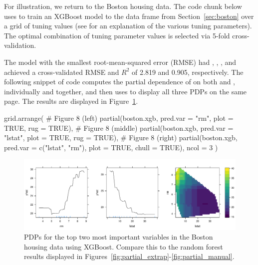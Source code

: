 For illustration, we return to the Boston housing data. The code chunk below uses  to train an XGBoost model to the  data frame from Section~\ref{sec:boston} over a grid of tuning values (see  for an explanation of the various tuning parameters). The optimal combination of tuning parameter values is selected via 5-fold cross-validation.
The model with the smallest root-mean-squared error (RMSE) had , , , and achieved a cross-validated RMSE and $R^2$ of 2.819 and 0.905, respectively. The following snippet of code computes the partial dependence of  on both  and , individually and together, and then uses  to display all three PDPs on the same page. The results are displayed in Figure~\ref{fig:boston_xgb}.
\begin{example}
grid.arrange(
  # Figure 8 (left)
  partial(boston.xgb, pred.var = "rm", plot = TRUE, rug = TRUE),
  # Figure 8 (middle)
  partial(boston.xgb, pred.var = "lstat", plot = TRUE, rug = TRUE),
  # Figure 8 (right)
  partial(boston.xgb, pred.var = c("lstat", "rm"), plot = TRUE, chull = TRUE),
  ncol = 3
)
\end{example}

\begin{figure}[!htbp]
  \centering
  \includegraphics[width=1.0\linewidth]{boston_xgb}
  \caption{PDPs for the top two most important variables in the Boston housing data using XGBoost. Compare this to the random forest results displayed in Figures~\ref{fig:partial_extrap}-\ref{fig:partial_manual}.}
  \label{fig:boston_xgb}
\end{figure}

